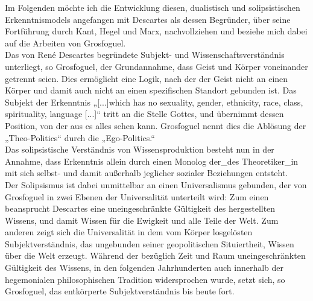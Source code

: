 \noindent Im Folgenden möchte ich die Entwicklung diesen, dualistisch und solipsistischen
Erkenntnismodels angefangen mit Descartes als dessen Begründer, über seine
Fortführung durch Kant, Hegel und Marx, nachvollziehen und beziehe mich dabei
auf die Arbeiten von Grosfoguel.\\

Das von René Descartes begründete Subjekt-
und Wissenschaftsverständnis unterliegt, so Grosfoguel, der Grundannahme, dass
Geist und Körper voneinander getrennt seien. Dies ermöglicht eine Logik, nach
der der Geist nicht an einen Körper und damit auch nicht an einen spezifischen
Standort gebunden ist.\footnotemark {}
Das Subjekt der Erkenntnis  „[...]which has no
sexuality, gender, ethnicity, race, class, spirituality, language [...]“
\footnotemark {} tritt an die Stelle
Gottes, und übernimmt dessen Position, von der aus es alles sehen kann.
Grosfoguel nennt dies die Ablösung der  „Theo-Politics“ \footnotemark
{} durch die
„Ego-Politics.“\footnotemark {}\\
Das solipsistische Verständnis von Wissensproduktion besteht nun in der
Annahme, dass Erkenntnis allein durch einen Monolog der\_des Theoretiker\_in mit sich
selbst- und damit außerhalb jeglicher sozialer Beziehungen entsteht.\footnotemark {}\\

\noindent Der Solipsismus ist dabei unmittelbar an einen Universalismus gebunden, der von
Grosfoguel in zwei Ebenen der Universalität unterteilt wird: Zum einen
beansprucht Descartes eine uneingeschränkte Gültigkeit des hergestellten
Wissens, und damit Wissen für die Ewigkeit und alle Teile der Welt. Zum anderen
zeigt sich die Universalität in dem vom Körper losgelösten Subjektverständnis,
das ungebunden seiner geopolitischen Situiertheit, Wissen über die Welt
erzeugt. Während der bezüglich Zeit und Raum  uneingeschränkten Gültigkeit des
Wissens, in den folgenden Jahrhunderten auch innerhalb der hegemonialen
philosophischen Tradition widersprochen wurde, setzt sich, so Grosfoguel, das
entkörperte Subjektverständnis bis heute fort.\\

